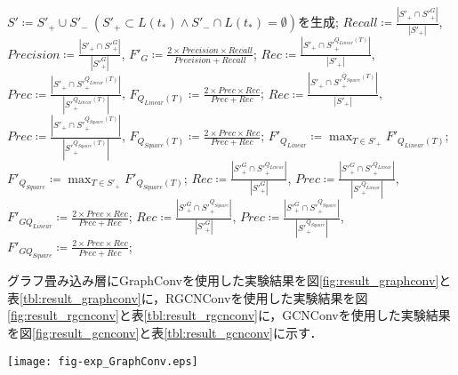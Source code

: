 \begin{algorithm}[tb]
\begin{algorithmic}[1]
  \State $S'\coloneqq S'_+\cup S'_-~(S'_+\subset L(t_{\ast})\land S'_-\cap L(t_{\ast})=\emptyset)$を生成;
  \State $Recall\coloneqq\frac{|{S'}_+\cap {S'}_+^G|}{|{S'}_+|}$,
      $Precision\coloneqq\frac{|{S'}_+\cap {S'}_+^G|}{|{S'}_+^G|}$,
      $F'_G\coloneqq\frac{2\times Precision\times Recall}{Precision+Recall}$;
      \State $Rec\coloneqq\frac{|{S'}_+\cap {S'}_{+}^{Q_{Linear}(T)}|}{|{S'}_+|}$,
      $Prec\coloneqq\frac{|{S'}_+\cap {S'}_{+}^{Q_{Linear}(T)}|}{|{S'}_{+}^{Q_{Linear}(T)}|}$,
      $F_{Q_{Linear}(T)}\coloneqq\frac{2\times Prec\times Rec}{Prec+Rec}$;
      \State $Rec\coloneqq\frac{|{S'}_+\cap {S'}_{+}^{Q_{Square}(T)}|}{|{S'}_+|}$,
      $Prec\coloneqq\frac{|{S'}_+\cap {S'}_{+}^{Q_{Square}(T)}|}{|{S'}_{+}^{Q_{Square}(T)}|}$,
      $F_{Q_{Square}(T)}\coloneqq\frac{2\times Prec\times Rec}{Prec+Rec}$;
    \EndFor
  \State ${F'}_{Q_{Linear}}\coloneqq\max_{T\in {S'}_+}{F'}_{Q_{Linear}(T)}$;
  \State ${F'}_{Q_{Square}}\coloneqq\max_{T\in {S'}_+}{F'}_{Q_{Square}(T)}$;
  \State $Rec\coloneqq\frac{|{S'}_+^G\cap {S'}_+^{Q_{Linear}}|}{|{S'}_+^G|}$,
  $Prec\coloneqq\frac{|{S'}_+^G\cap {S'}_+^{Q_{Linear}}|}{|{S'}_+^{Q_{Linear}}|}$,
  $F'_{GQ_{Linear}}\coloneqq\frac{2\times Prec\times Rec}{Prec+Rec}$;
  \State $Rec\coloneqq\frac{|{S'}_+^G\cap {S'}_+^{Q_{Square}}|}{|{S'}_+^G|}$,
  $Prec\coloneqq\frac{|{S'}_+^G\cap {S'}_+^{Q_{Square}}|}{|{S'}_+^{Q_{Square}}|}$,
  $F'_{GQ_{Square}}\coloneqq\frac{2\times Prec\times Rec}{Prec+Rec}$;
\end{algorithmic}
\end{algorithm}

グラフ畳み込み層にGraphConvを使用した実験結果を図\ref{fig:result_graphconv}と表\ref{tbl:result_graphconv}に，RGCNConvを使用した実験結果を図\ref{fig:result_rgcnconv}と表\ref{tbl:result_rgcnconv}に，GCNConvを使用した実験結果を図\ref{fig:result_gcnconv}と表\ref{tbl:result_gcnconv}に示す．

\begin{figure*}[tb]
  \centering
  \texttt{[image: fig-exp\_GraphConv.eps]}
  \caption{横軸のF値超を達成した実験の割合(GraphConv)}\label{fig:result_graphconv}
\end{figure*}

